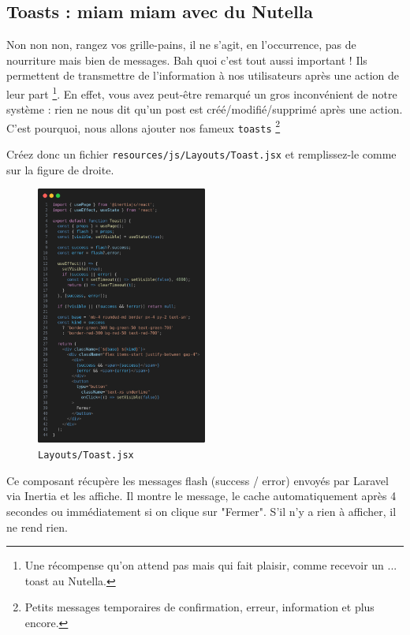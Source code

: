\subsection{Toasts : miam miam avec du Nutella}\label{sec:messages}
Non non non, rangez vos grille-pains, il ne s'agit, en l'occurrence, pas de nourriture mais bien de messages. Bah quoi c'est tout aussi important ! Ils permettent de transmettre de l'information à nos utilisateurs après une action de leur part \footnote{Une récompense qu'on attend pas mais qui fait plaisir, comme recevoir un ... toast au Nutella.}. En effet, vous avez peut-être remarqué un gros inconvénient de notre système : rien ne nous dit qu'un post est créé/modifié/supprimé après une action. C'est pourquoi, nous allons ajouter nos fameux \texttt{toasts} \footnote{Petits messages temporaires de confirmation, erreur, information et plus encore.}

Créez donc un fichier \verb|resources/js/Layouts/Toast.jsx| et remplissez-le comme sur la figure de droite.


\begin{figure}
    \vspace{-0.5cm}
    \includegraphics[width=0.5\textwidth]{figures-C1/posts_toast.png}    
    \captionsetup{singlelinecheck=true}   
    \caption{\texttt{Layouts/Toast.jsx}}
    \label{fig:posts_toast}
\end{figure}
Ce composant récupère les messages flash (success / error) envoyés par Laravel via Inertia et les affiche. Il montre le message, le cache automatiquement après 4 secondes ou immédiatement si on clique sur "Fermer". S’il n’y a rien à afficher, il ne rend rien.

